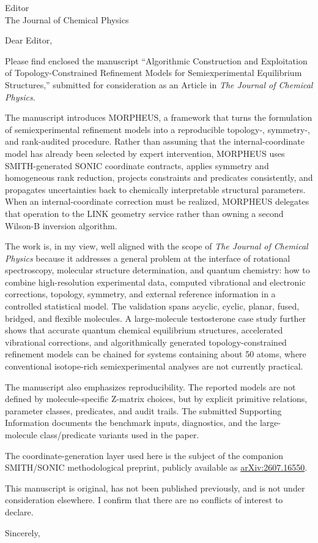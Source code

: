 \documentclass[11pt]{letter}
\begin{document}
\begin{letter}{Editor\\
The Journal of Chemical Physics}

\opening{Dear Editor,}

Please find enclosed the manuscript ``Algorithmic Construction and Exploitation
of Topology-Constrained Refinement Models for Semiexperimental Equilibrium
Structures,'' submitted for consideration as an Article in \emph{The Journal of
Chemical Physics}.

The manuscript introduces MORPHEUS, a framework that turns the formulation of
semiexperimental refinement models into a reproducible topology-, symmetry-,
and rank-audited procedure. Rather than assuming that the internal-coordinate
model has already been selected by expert intervention, MORPHEUS uses
SMITH-generated SONIC coordinate contracts, applies symmetry and homogeneous
rank reduction, projects constraints and predicates consistently, and
propagates uncertainties back to chemically interpretable structural
parameters. When an internal-coordinate correction must be realized,
MORPHEUS delegates that operation to the LINK geometry service rather than
owning a second Wilson-B inversion algorithm.

The work is, in my view, well aligned with the scope of \emph{The Journal of
Chemical Physics} because it addresses a general problem at the interface of
rotational spectroscopy, molecular structure determination, and quantum
chemistry: how to combine high-resolution experimental data, computed
vibrational and electronic corrections, topology, symmetry, and external
reference information in a controlled statistical model. The validation spans
acyclic, cyclic, planar, fused, bridged, and flexible molecules. A
large-molecule testosterone case study further shows that accurate quantum
chemical equilibrium structures, accelerated vibrational corrections, and
algorithmically generated topology-constrained refinement models can be chained
for systems containing about 50 atoms, where conventional isotope-rich
semiexperimental analyses are not currently practical.

The manuscript also emphasizes reproducibility. The reported models are not
defined by molecule-specific Z-matrix choices, but by explicit primitive
relations, parameter classes, predicates, and audit trails. The submitted
Supporting Information documents the benchmark inputs, diagnostics, and the
large-molecule class/predicate variants used in the paper.

The coordinate-generation layer used here is the subject of the companion
SMITH/SONIC methodological preprint, publicly available as
\href{https://arxiv.org/abs/2607.16550}{arXiv:2607.16550}.

This manuscript is original, has not been published previously, and is not
under consideration elsewhere. I confirm that there are no conflicts of
interest to declare.

\closing{Sincerely,}

\end{letter}
\end{document}
